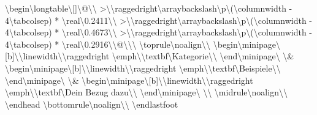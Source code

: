 \textbackslash{}begin\textbackslash{}{longtable\textbackslash{}}[]\textbackslash{}{@\textbackslash{}{\textbackslash{}}
  >\textbackslash{}{\textbackslash{}raggedright\textbackslash{}arraybackslash\textbackslash{}}p\textbackslash{}{(\textbackslash{}columnwidth - 4\textbackslash{}tabcolsep) * \textbackslash{}real\textbackslash{}{0.2411\textbackslash{}}\textbackslash{}}
  >\textbackslash{}{\textbackslash{}raggedright\textbackslash{}arraybackslash\textbackslash{}}p\textbackslash{}{(\textbackslash{}columnwidth - 4\textbackslash{}tabcolsep) * \textbackslash{}real\textbackslash{}{0.4673\textbackslash{}}\textbackslash{}}
  >\textbackslash{}{\textbackslash{}raggedright\textbackslash{}arraybackslash\textbackslash{}}p\textbackslash{}{(\textbackslash{}columnwidth - 4\textbackslash{}tabcolsep) * \textbackslash{}real\textbackslash{}{0.2916\textbackslash{}}\textbackslash{}}@\textbackslash{}{\textbackslash{}}\textbackslash{}}
\textbackslash{}toprule\textbackslash{}noalign\textbackslash{}{\textbackslash{}}
\textbackslash{}begin\textbackslash{}{minipage\textbackslash{}}[b]\textbackslash{}{\textbackslash{}linewidth\textbackslash{}}\textbackslash{}raggedright
\textbackslash{}emph\textbackslash{}{\textbackslash{}textbf\textbackslash{}{Kategorie\textbackslash{}}\textbackslash{}}
\textbackslash{}end\textbackslash{}{minipage\textbackslash{}} \textbackslash{}& \textbackslash{}begin\textbackslash{}{minipage\textbackslash{}}[b]\textbackslash{}{\textbackslash{}linewidth\textbackslash{}}\textbackslash{}raggedright
\textbackslash{}emph\textbackslash{}{\textbackslash{}textbf\textbackslash{}{Beispiele\textbackslash{}}\textbackslash{}}
\textbackslash{}end\textbackslash{}{minipage\textbackslash{}} \textbackslash{}& \textbackslash{}begin\textbackslash{}{minipage\textbackslash{}}[b]\textbackslash{}{\textbackslash{}linewidth\textbackslash{}}\textbackslash{}raggedright
\textbackslash{}emph\textbackslash{}{\textbackslash{}textbf\textbackslash{}{Dein Bezug dazu\textbackslash{}}\textbackslash{}}
\textbackslash{}end\textbackslash{}{minipage\textbackslash{}} \textbackslash{}\textbackslash{}
\textbackslash{}midrule\textbackslash{}noalign\textbackslash{}{\textbackslash{}}
\textbackslash{}endhead
\textbackslash{}bottomrule\textbackslash{}noalign\textbackslash{}{\textbackslash{}}
\textbackslash{}endlastfoot
